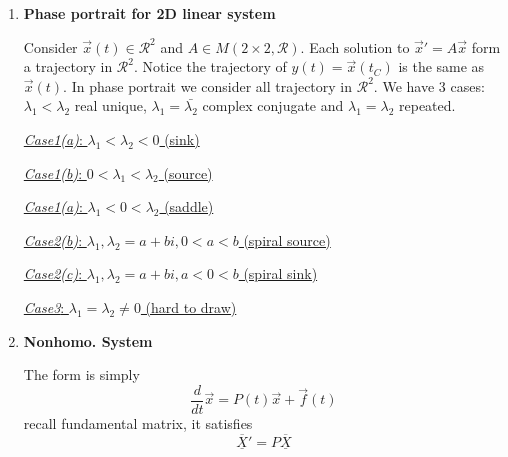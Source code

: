 \documentclass[9pt]{article}
\theoremstyle{definition}
\newcommand{\fundmx}[1]{\overline{\underline{X}}}
\newenvironment{changemargin}[2]{%
  \begin{list}{}{%
    \setlength{\topsep}{0pt}%
    \setlength{\leftmargin}{#1}%
    \setlength{\rightmargin}{#2}%
    \setlength{\listparindent}{\parindent}%
    \setlength{\itemindent}{\parindent}%
    \setlength{\parsep}{\parskip}%
  }%
  \item[]}{\end{list}}
\theoremstyle{theorem}
\theoremstyle{remark}
\theoremstyle{lemma}
\begin{document}
\begin{changemargin}{-0.125in}{0in}
\begin{enumerate}
\begin{enumerate}
        \end{enumerate}
        
        \medskip
        
        \item \textbf{Phase portrait for 2D linear system}
        
        \smallskip
        
        Consider $\overrightarrow{x}(t) \in \mathcal{R}^2$ and $A \in M(2 \times 2, \mathcal{R})$. Each solution to $\overrightarrow{x}' = A \overrightarrow{x}$ form a trajectory in $\mathcal{R}^2$. Notice the trajectory of $y(t) = \overrightarrow{x}(t _C)$ is the same as $\overrightarrow{x}(t)$. In phase portrait we consider all trajectory in $\mathcal{R}^2$. We have 3 cases: $\lambda_1 < \lambda_2$ real unique, $\lambda_1 = \bar{\lambda_2}$ complex conjugate and $\lambda_1 = \lambda_2$ repeated.
        
        \bigskip
        
        \underline{\textit{Case1(a)}: $\lambda_1 < \lambda_2 < 0$ (sink)}
        
        \smallskip
        
        \underline{\textit{Case1(b)}: $0 < \lambda_1 < \lambda_2$ (source)}
        
        \smallskip
        
        \underline{\textit{Case1(a)}: $\lambda_1 < 0 < \lambda_2$ (saddle)}
        
        \smallskip
        
        
        \smallskip
        
        \underline{\textit{Case2(b)}: $\lambda_1, \lambda_2 = a + bi, 0 < a < b $ (spiral source)}
        
        \smallskip
        
        \underline{\textit{Case2(c)}: $\lambda_1, \lambda_2 = a + bi,  a < 0 < b $ (spiral sink)}
        
        \smallskip
        
        \underline{\textit{Case3}: $\lambda_1 = \lambda_2 \neq 0 $ (hard to draw)}
        
        
     \bigskip

     \item \textbf{Nonhomo. System}

     \medskip
     
     The form is simply 
     \[
     \frac{d}{dt}\overrightarrow{x} = P(t)\overrightarrow{x} + \overrightarrow{f}(t)
     \]
     recall fundamental matrix, it satisfies 
     \[
     \fundmx{a} '= P \fundmx{a}
     \]
     

\end{enumerate}
\end{changemargin}
\end{document}
